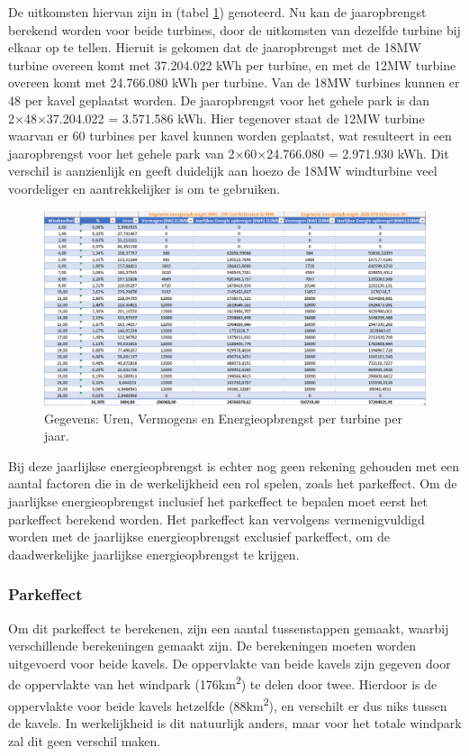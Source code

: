 De uitkomsten hiervan zijn in (tabel \ref{fig:Jaaropbrengst}) genoteerd. Nu kan de jaaropbrengst berekend worden voor beide turbines, door de uitkomsten van dezelfde turbine bij elkaar op te tellen. Hieruit is gekomen dat de jaaropbrengst met de 18MW turbine overeen komt met 37.204.022 kWh per turbine, en met de 12MW turbine overeen komt met 24.766.080 kWh per turbine. Van de 18MW turbines kunnen er 48 per kavel geplaatst worden. De jaaropbrengst voor het gehele park is dan 2×48×37.204.022 = 3.571.586 kWh. Hier tegenover staat de 12MW turbine waarvan er 60 turbines per kavel kunnen worden geplaatst, wat resulteert in een jaaropbrengst voor het gehele park van 2×60×24.766.080 = 2.971.930 kWh. Dit verschil is aanzienlijk en geeft duidelijk aan hoezo de 18MW windturbine veel voordeliger en aantrekkelijker is om te gebruiken.
\begin{figure}[H]
\centering
\includegraphics[width=1\textwidth]{IMG/data/overzicht/uren,vermogens,energieopbrengst.PNG}
\caption{Gegevens: Uren, Vermogens en Energieopbrengst per turbine per jaar.}
\label{fig:Jaaropbrengst}
\end{figure}
Bij deze jaarlijkse energieopbrengst is echter nog geen rekening gehouden met een aantal factoren die in de werkelijkheid een rol spelen, zoals het parkeffect. Om de jaarlijkse energieopbrengst inclusief het parkeffect te bepalen moet eerst het parkeffect berekend worden. Het parkeffect kan vervolgens vermenigvuldigd worden met de jaarlijkse energieopbrengst exclusief parkeffect, om de daadwerkelijke jaarlijkse energieopbrengst te krijgen. 

\subsubsection{Parkeffect}
Om dit parkeffect te berekenen, zijn een aantal tussenstappen gemaakt, waarbij verschillende berekeningen gemaakt zijn. De berekeningen moeten worden uitgevoerd voor beide kavels. De oppervlakte van beide kavels zijn gegeven door de oppervlakte van het windpark (176km\textsuperscript{2}) te delen door twee. Hierdoor is de oppervlakte voor beide kavels hetzelfde (88km\textsuperscript{2}), en verschilt er dus niks tussen de kavels. In werkelijkheid is dit natuurlijk anders, maar voor het totale windpark zal dit geen verschil maken. 

